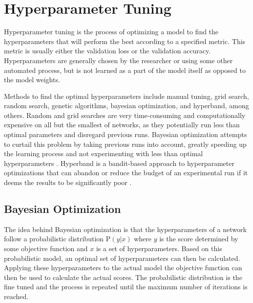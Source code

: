 \section{Hyperparameter Tuning}\label{section:background-hyperparameter}
Hyperparameter tuning is the process of optimizing a model to find the hyperparameters that will perform the best according to a specified metric. This metric is usually either the validation loss or the validation accuracy.
Hyperparameters are generally chosen by the researcher or using some other automated process, but is not learned as a part of the model itself as opposed to the model weights.

Methods to find the optimal hyperparameters include manual tuning, grid search, random search, genetic algorithms, bayesian optimization, and hyperband, among others.
Random and grid searches are very time-consuming and computationally expensive on all but the smallest of networks, as they potentially run less than optimal parameters and disregard previous runs.
Bayesian optimization attempts to curtail this problem by taking previous runs into account, greatly speeding up the learning process and not experimenting with less than optimal hyperparameters \cite{bayesian}.
Hyperband is a bandit-based approach to hyperparameter optimizations that can abandon or reduce the budget of an experimental run if it deems the results to be significantly poor \cite{hyperband}.

\subsection{Bayesian Optimization}\label{subsection:background-bayesian}
The idea behind Bayesian optimization is that the hyperparameters of a network follow a probabilistic distribution $\text{P}(y | x)$ where $y$ is the score determined by some objective function and $x$ is a set of hyperparameters.
Based on this probabilistic model, an optimal set of hyperparameters can then be calculated.
Applying these hyperparameters to the actual model the objective function can then be used to calculate the actual scores.
The probabilistic distribution is the fine tuned and the process is repeated until the maximum number of iterations is reached.

